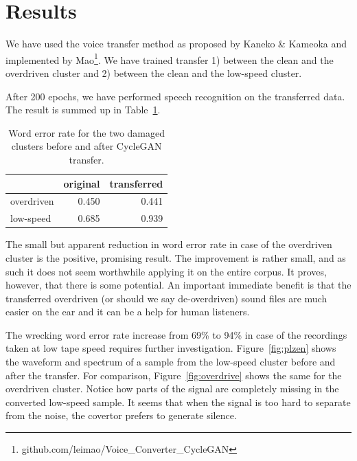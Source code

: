 \documentclass[runningheads,a4paper]{llncs}
\begin{document}
\section{Results}

We have used the voice transfer method as proposed by Kaneko \&
Kameoka\cite{kaneko2017parallel} and implemented by
Mao\footnote{github.com/leimao/Voice\_Converter\_CycleGAN}. We have trained
transfer 1) between the clean and the overdriven cluster and 2) between the
clean and the low-speed cluster.

After 200 epochs, we have performed speech recognition on the transferred data.
The result is summed up in Table~\ref{tab:results}.

\begin{table}[htpb]
\begin{center}
\begin{tabular}{|l||r|r|}
\hline
           & original & transferred \\
\hline
overdriven & 0.450 & 0.441 \\
low-speed  & 0.685 & 0.939 \\
\hline
\end{tabular}
\caption{Word error rate for the two damaged clusters before and after CycleGAN
transfer.}\label{tab:results}
\end{center}
\end{table}

The small but apparent reduction in word error rate in case of the overdriven
cluster is the positive, promising result. The improvement is rather small, and
as such it does not seem worthwhile applying it on the entire corpus. It
proves, however, that there is some potential. An important immediate benefit is
that the transferred overdriven (or should we say de-overdriven) sound files are
much easier on the ear and it can be a help for human listeners.

The wrecking word error rate increase from 69\% to 94\% in case of the
recordings taken at low tape speed requires further investigation.
Figure~\ref{fig:plzen} shows the waveform and spectrum of a sample from the low-speed
cluster before and after the transfer. For comparison,
Figure~\ref{fig:overdrive} shows the same for the overdriven cluster.
Notice how parts of the signal are completely missing in the converted low-speed
sample. It seems that when the signal is too hard to separate from the noise,
the covertor prefers to generate silence.
\end{document}
